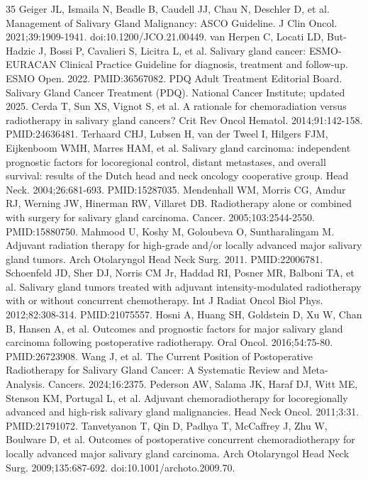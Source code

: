 \documentclass[10pt,twocolumn]{article}
\begin{document}
\begin{thebibliography}{35}
 Geiger JL, Ismaila N, Beadle B, Caudell JJ, Chau N, Deschler D, et al. Management of Salivary Gland Malignancy: ASCO Guideline. J Clin Oncol. 2021;39:1909-1941. doi:10.1200/JCO.21.00449.
 van Herpen C, Locati LD, But-Hadzic J, Bossi P, Cavalieri S, Licitra L, et al. Salivary gland cancer: ESMO-EURACAN Clinical Practice Guideline for diagnosis, treatment and follow-up. ESMO Open. 2022. PMID:36567082.
 PDQ Adult Treatment Editorial Board. Salivary Gland Cancer Treatment (PDQ). National Cancer Institute; updated 2025.
 Cerda T, Sun XS, Vignot S, et al. A rationale for chemoradiation versus radiotherapy in salivary gland cancers? Crit Rev Oncol Hematol. 2014;91:142-158. PMID:24636481.
 Terhaard CHJ, Lubsen H, van der Tweel I, Hilgers FJM, Eijkenboom WMH, Marres HAM, et al. Salivary gland carcinoma: independent prognostic factors for locoregional control, distant metastases, and overall survival: results of the Dutch head and neck oncology cooperative group. Head Neck. 2004;26:681-693. PMID:15287035.
 Mendenhall WM, Morris CG, Amdur RJ, Werning JW, Hinerman RW, Villaret DB. Radiotherapy alone or combined with surgery for salivary gland carcinoma. Cancer. 2005;103:2544-2550. PMID:15880750.
 Mahmood U, Koshy M, Goloubeva O, Suntharalingam M. Adjuvant radiation therapy for high-grade and/or locally advanced major salivary gland tumors. Arch Otolaryngol Head Neck Surg. 2011. PMID:22006781.
 Schoenfeld JD, Sher DJ, Norris CM Jr, Haddad RI, Posner MR, Balboni TA, et al. Salivary gland tumors treated with adjuvant intensity-modulated radiotherapy with or without concurrent chemotherapy. Int J Radiat Oncol Biol Phys. 2012;82:308-314. PMID:21075557.
 Hosni A, Huang SH, Goldstein D, Xu W, Chan B, Hansen A, et al. Outcomes and prognostic factors for major salivary gland carcinoma following postoperative radiotherapy. Oral Oncol. 2016;54:75-80. PMID:26723908.
 Wang J, et al. The Current Position of Postoperative Radiotherapy for Salivary Gland Cancer: A Systematic Review and Meta-Analysis. Cancers. 2024;16:2375.
 Pederson AW, Salama JK, Haraf DJ, Witt ME, Stenson KM, Portugal L, et al. Adjuvant chemoradiotherapy for locoregionally advanced and high-risk salivary gland malignancies. Head Neck Oncol. 2011;3:31. PMID:21791072.
 Tanvetyanon T, Qin D, Padhya T, McCaffrey J, Zhu W, Boulware D, et al. Outcomes of postoperative concurrent chemoradiotherapy for locally advanced major salivary gland carcinoma. Arch Otolaryngol Head Neck Surg. 2009;135:687-692. doi:10.1001/archoto.2009.70.

\end{thebibliography}
\end{document}
